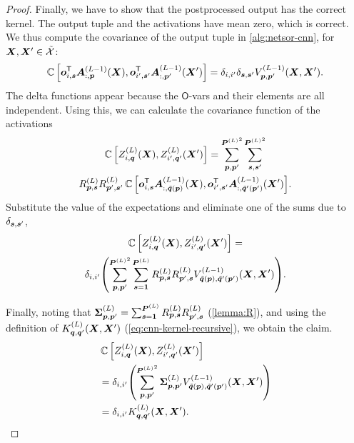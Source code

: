 \documentclass[accepted]{uai2021} %
\newcommand{\Ova}{\mathsf{O}}
\newcommand{\layerAsm}[3]{Z^{(#1)}_{#2}\bra{#3}}
\newcommand{\layernlasm}[3]{\vA^{(#1)}_{#2}\bra{#3}}
\newcommand{\patchsizebase}{\vP}
\newcommand{\patchsize}[1]{{\patchsizebase^{\bra{#1}}}}
\newcommand{\patchf}[2]{{\tilde#1\bra{#2}}}
\newcommand{\priorWcov}[1]{\boldsymbol{\Sigma}^{(#1)}}
\newcommand{\chan}{i}
\newcommand{\patch}{\vp}               %
\newcommand{\nextpatch}{\vq}
\newcommand{\covf}[1]{K\ssup{#1}}
\newcommand{\nlinf}[1]{V\ssup{#1}}
\newcommand{\0}{\boldsymbol{0}}
\newcommand{\1}{\boldsymbol{1}}
\newcommand{\crefp}[1]{(\cref{#1})}
\newcommand{\eqparref}{\crefp}
\begin{document}
\begin{proof}
  Finally, we have to show that the postprocessed output has the correct kernel.
  The output tuple and the activations have mean zero, which is correct. We thus compute the covariance of the output tuple in \cref{alg:netsor-cnn}, for ${\bm{X}},{\bm{X}}' \in \tilde{{\mathcal{X}}}$:
  \begin{equation}
    \Cov\sqb{
      \vo_{\chan,\vs}^\tp \layernlasm{L-1}{:,\patch}{\mX},
      \vo_{\chan',\vs'}^\tp \layernlasm{L-1}{:,\patch'}{\mX'}
    } = \delta_{\chan,\chan'} \delta_{\vs,\vs'} \nlinf{L-1}_{\patch,\patch'}\bra{\mX,\mX'}.
  \end{equation}
  The delta functions appear because the $\Ova$-vars and their elements are all independent. Using this, we can calculate the covariance function of the activations
  \begin{multline}
\Cov\sqb{
  \layerAsm{L}{\chan,\nextpatch}{\vX}, \layerAsm{L}{\chan',\nextpatch'}{\vX'}}
= \sum_{\patch,\patch'}^{\patchsize{L}^{2}}\sum_{\vs,\vs'}^{\patchsize{L}^{2}}\\
R\ssup{L}_{\patch,\vs} R\ssup{L}_{\patch',\vs'}
\Cov\sqb{
      \vo_{\chan,\vs}^\tp \layernlasm{L-1}{:,\patchf{\nextpatch}{\patch}}{\mX},
      \vo_{\chan',\vs'}^\tp \layernlasm{L-1}{:,\patchf{\nextpatch'}{\patch'}}{\mX'}
    }.
\end{multline}
Substitute the value of the expectations and eliminate one of the sums due to $\delta_{{\bm{s}},{\bm{s}}'}$,
\begin{multline}
\Cov\sqb{
  \layerAsm{L}{\chan,\nextpatch}{\vX}, \layerAsm{L}{\chan',\nextpatch'}{\vX'}} =\\
\delta_{\chan,\chan'} \bra{\sum_{\patch,\patch'}^{\patchsize{L}^{2}}\sum_{\vs=\1}^{\patchsize{L}}
   R\ssup{L}_{\patch,\vs} R\ssup{L}_{\patch',\vs} \nlinf{L-1}_{\patchf{\nextpatch}{\patch},\patchf{\nextpatch'}{\patch'}}\bra{\mX,\mX'} }.
\end{multline}

Finally, noting that $\priorWcov{L}_{\patch,\patch'} = \sum_{\vs=\1}^{\patchsize{L}} R\ssup{L}_{\patch,\vs} R\ssup{L}_{\patch',\vs} $ \crefp{lemma:R}, and using the definition of $\covf{L}_{\nextpatch,\nextpatch'}\bra{\mX,\mX'}$ \eqparref{eq:cnn-kernel-recursive}, we obtain the claim.
\begin{align}
&\Cov\sqb{
  \layerAsm{L}{\chan,\nextpatch}{\vX}, \layerAsm{L}{\chan',\nextpatch'}{\vX'}}\nonumber\\
  &= \delta_{\chan,\chan'} \bra{
\sum_{\patch,\patch'}^{\patchsize{L}^{2}} \priorWcov{L}_{\patch,\patch'} \nlinf{L-1}_{\patchf{\nextpatch}{\patch},\patchf{\nextpatch'}{\patch'}}\bra{\mX,\mX'}
}  \nonumber\\
&= \delta_{\chan,\chan'} \covf{L}_{\nextpatch,\nextpatch'}\bra{\mX,\mX'}.
\end{align}
\end{proof}
\end{document}
